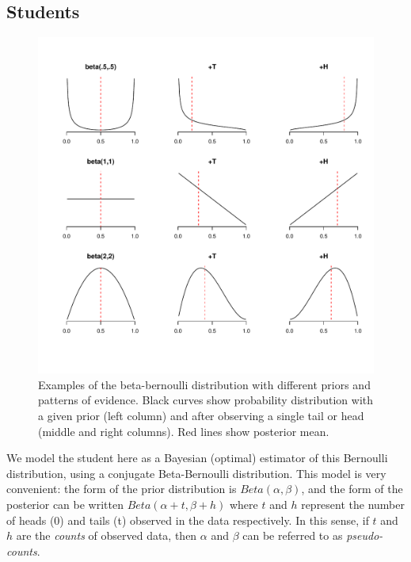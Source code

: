 \documentclass[10pt,letterpaper]{article}
\begin{document}
\subsection{Students}

\begin{figure}[t]
\begin{center}
\includegraphics[width=5.5in]{figures/students.pdf}
\end{center}
\caption{\label{fig:students} Examples of the beta-bernoulli distribution with different priors and patterns of evidence. Black curves show probability distribution with a given prior (left column) and after observing a single tail or head (middle and right columns). Red lines show posterior mean.}
\end{figure}

We model the student here as a Bayesian (optimal) estimator of this Bernoulli distribution, using a conjugate Beta-Bernoulli distribution. This model is very convenient: the form of the prior distribution is $Beta(\alpha,\beta)$, and the form of the posterior can be written $Beta(\alpha+t,\beta+h)$ where $t$ and $h$ represent the number of heads (0) and tails (t) observed in the data respectively. In this sense, if $t$ and $h$ are the \emph{counts} of observed data, then $\alpha$ and $\beta$ can be referred to as \emph{pseudo-counts}.
\end{document}
